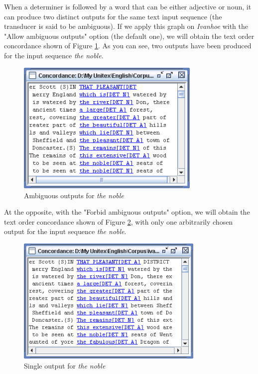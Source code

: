 \bigskip
\noindent When a determiner is followed by a word that can be either adjective or noun,
it can produce two distinct outputs for the same text input sequence (the transducer is
said to be ambiguous).  If we apply this graph on \textit{Ivanhoe} with the "Allow ambiguous
outputs" option (the default one), we will obtain the text order
concordance shown of Figure \ref{fig6-advanced-options3}. As you can see, two
outputs have been produced for the input sequence \textit{the noble}.

\begin{figure}[!h]
\begin{center}
\includegraphics[width=8.8cm]{resources/img/fig6-advanced-options3.png}
\caption{Ambiguous outputs for \textit{the noble}\label{fig6-advanced-options3}}
\end{center}
\end{figure}

\bigskip
\noindent At the opposite, with the "Forbid ambiguous
outputs" option, we will obtain the text order
concordance shown of Figure \ref{fig6-advanced-options4}, with only one
arbitrarily chosen output for the input sequence \textit{the noble}.

\begin{figure}[!h]
\begin{center}
\includegraphics[width=9cm]{resources/img/fig6-advanced-options4.png}
\caption{Single output for \textit{the noble}\label{fig6-advanced-options4}}
\end{center}
\end{figure}

